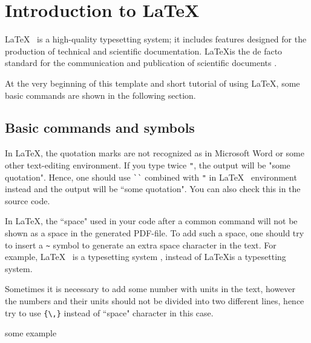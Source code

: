 \chapter{Introduction to \LaTeX}

\LaTeX ~ is a high-quality typesetting system; it includes features designed for the production of technical and scientific documentation. \LaTeX is the de facto standard for the communication and publication of scientific documents \cite{LaTeX3Team.}.

At the very beginning of this template and short tutorial of using \LaTeX, some basic commands are shown in the following section.

\section{Basic commands and symbols}
	
	In \LaTeX, the quotation marks are not recognized as in Microsoft Word or some other text-editing environment. If you type twice {\verb!"!}, the output will be "some quotation". Hence, one should use {\verb!``!} combined with {\verb!"!} in \LaTeX ~ environment instead and the output will be ``some quotation". You can also check this in the source code.
	
	In \LaTeX, the ``space" used in your code after a common command will not be shown as a space in the generated PDF-file. To add such a space, one should try to insert a {\verb!~!} symbol to generate an extra space character in the text. For example, \LaTeX ~ is a typesetting system , instead of \LaTeX is a typesetting system.
	
	Sometimes it is necessary to add some number with units in the text, however the numbers and their units should not be divided into two different lines, hence try to use {\verb!{\,}!} instead of ``space" character in this case.
	
	{\color{red} some example}
	
	
	
